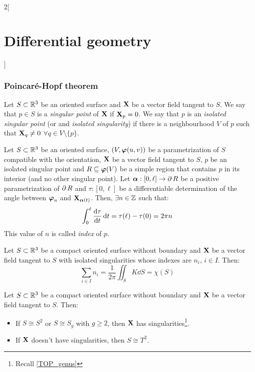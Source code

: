 \documentclass[../../../main_math.tex]{subfiles}
\begin{document}
\begin{multicols}{2}[\section{Differential geometry}]
  \subsubsection{Poincaré-Hopf theorem}
  \begin{definition}
    Let $S\subset\mathbb{R}^3$ be an oriented surface and $\boldsymbol{\mathrm{X}}$ be a vector field tangent to $S$. We say that $p\in S$ is a \emph{singular point} of $\boldsymbol{\mathrm{X}}$ if $\boldsymbol{\mathrm{X}}_p=0$. We say that $p$ is an \emph{isolated singular point} (or and \emph{isolated singularity}) if there is a neighbourhood $V$ of $p$ such that $\boldsymbol{\mathrm{X}}_q\ne 0$ $\forall q\in V\setminus\{p\}$.
  \end{definition}
  \begin{proposition}
    Let $S\subset\mathbb{R}^3$ be an oriented surface, $(V,\boldsymbol{\mathrm{\varphi}}(u,v))$ be a parametrization of $S$ compatible with the orientation, $\boldsymbol{\mathrm{X}}$ be a vector field tangent to $S$, $p$ be an isolated singular point and $R\subseteq \boldsymbol{\mathrm{\varphi}}(V)$ be a simple region that contains $p$ in its interior (and no other singular point). Let $\boldsymbol{\mathrm{\alpha}}:[0,\ell]\rightarrow\operatorname{\partial}{R}$ be a positive parametrization of $\operatorname{\partial}{R}$ and $\tau:[0,\ell]$ be a differentiable determination of the angle between $\boldsymbol{\mathrm{\varphi}}_u$ and $\boldsymbol{\mathrm{X}}_{\boldsymbol{\mathrm{\alpha}}(t)}$. Then, $\exists n\in\mathbb{Z}$ such that: $$\int_0^\ell\dv{\tau}{t}\dd{t}=\tau(\ell)-\tau(0)=2\pi n$$
    This value of $n$ is called \emph{index} of $p$.
  \end{proposition}
  \begin{theorem}
    Let $S\subset\mathbb{R}^3$ be a compact oriented surface without boundary and $\boldsymbol{\mathrm{X}}$ be a vector field tangent to $S$ with isolated singularities whose indexes are $n_i$, $i\in I$. Then: $$\sum_{i\in I}n_i=\frac{1}{2\pi}\iint_SK\dd{S}=\chi(S)$$
  \end{theorem}
  \begin{corollary}
    Let $S\subset\mathbb{R}^3$ be a compact oriented surface without boundary and $\boldsymbol{\mathrm{X}}$ be a vector field tangent to $S$. Then:
    \begin{itemize}
      \item If $S\cong S^2$ or $S\cong S_g$ with $g\geq 2$, then $\boldsymbol{\mathrm{X}}$ has singularities\footnote{Recall \cref{TOP_genus}}.
      \item If $\boldsymbol{\mathrm{X}}$ doesn't have singularities, then $S\cong T^2$.
    \end{itemize}
  \end{corollary}
\end{multicols}
\end{document}
